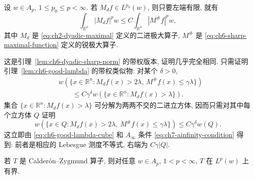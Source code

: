 \hypertarget{chapter-07-page-156}{}
\begin{Lemma}
\label{lem:ch7-weighted-dyadic-sharp}
设 $w\in A_p$, $1\le p_0\le p<\infty$. 若 $M_df\in L^{p_0}(w)$, 则只要左端有限, 就有
\[
 \int_{\mathbb R^n}|M_df|^pw
 \le C\int_{\mathbb R^n}|M^\#f|^pw,
\]
其中 $M_d$ 是 \eqref{eq:ch2-dyadic-maximal} 定义的二进极大算子, $M^\#$ 是 \eqref{eq:ch6-sharp-maximal-function} 定义的锐极大算子.
\end{Lemma}

\begin{Proof}
这是引理~\ref{lem:ch6-dyadic-sharp-norm} 的带权版本, 证明几乎完全相同. 只需证明引理~\ref{lem:ch6-good-lambda} 的带权类似物: 对某个 $\delta>0$,
\[
\begin{aligned}
 &w(\{x\in\mathbb R^n:M_df(x)>2\lambda,\ M^\#f(x)\le\gamma\lambda\})\\
 &\qquad\le C\gamma^\delta
 w(\{x\in\mathbb R^n:M_df(x)>\lambda\}).
\end{aligned}
\]
集合 $\{x\in\mathbb R^n:M_df(x)>\lambda\}$ 可分解为两两不交的二进立方体, 因而只需对其中每个立方体 $Q$ 证明
\[
 w(\{x\in Q:M_df(x)>2\lambda,\ M^\#f(x)\le\gamma\lambda\})
 \le C\gamma^\delta w(Q).
\]
这立即由 \eqref{eq:ch6-good-lambda-cube} 和 $A_\infty$ 条件 \eqref{eq:ch7-ainfinity-condition} 得到: 前者是相应的 Lebesgue 测度不等式, 右端为 $C\gamma|Q|$.
\end{Proof}

\begin{Theorem}
\label{thm:ch7-cz-weighted-strong}
若 $T$ 是 Calderón--Zygmund 算子, 则对任意 $w\in A_p$, $1<p<\infty$, $T$ 在 $L^p(w)$ 上有界.
\end{Theorem}

